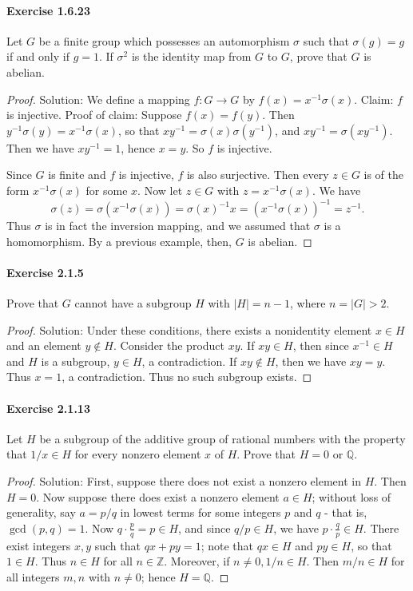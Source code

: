 \documentclass{article}
\theoremstyle{definition}
\begin{document}
\paragraph{Exercise 1.6.23} Let $G$ be a finite group which possesses an automorphism $\sigma$ such that $\sigma(g)=g$ if and only if $g=1$. If $\sigma^{2}$ is the identity map from $G$ to $G$, prove that $G$ is abelian.
\begin{proof}
    Solution: We define a mapping $f: G \rightarrow G$ by $f(x)=x^{-1} \sigma(x)$.
Claim: $f$ is injective.
Proof of claim: Suppose $f(x)=f(y)$. Then $y^{-1} \sigma(y)=x^{-1} \sigma(x)$, so that $x y^{-1}=\sigma(x) \sigma\left(y^{-1}\right)$, and $x y^{-1}=\sigma\left(x y^{-1}\right)$. Then we have $x y^{-1}=1$, hence $x=y$. So $f$ is injective.

Since $G$ is finite and $f$ is injective, $f$ is also surjective. Then every $z \in G$ is of the form $x^{-1} \sigma(x)$ for some $x$. Now let $z \in G$ with $z=x^{-1} \sigma(x)$. We have
$$
\sigma(z)=\sigma\left(x^{-1} \sigma(x)\right)=\sigma(x)^{-1} x=\left(x^{-1} \sigma(x)\right)^{-1}=z^{-1} .
$$
Thus $\sigma$ is in fact the inversion mapping, and we assumed that $\sigma$ is a homomorphism. By a previous example, then, $G$ is abelian.
\end{proof}



\paragraph{Exercise 2.1.5} Prove that $G$ cannot have a subgroup $H$ with $|H|=n-1$, where $n=|G|>2$.
\begin{proof}
    Solution: Under these conditions, there exists a nonidentity element $x \in H$ and an element $y \notin H$. Consider the product $x y$. If $x y \in H$, then since $x^{-1} \in H$ and $H$ is a subgroup, $y \in H$, a contradiction. If $x y \notin H$, then we have $x y=y$. Thus $x=1$, a contradiction. Thus no such subgroup exists.
\end{proof}



\paragraph{Exercise 2.1.13} Let $H$ be a subgroup of the additive group of rational numbers with the property that $1 / x \in H$ for every nonzero element $x$ of $H$. Prove that $H=0$ or $\mathbb{Q}$.
\begin{proof}
    Solution: First, suppose there does not exist a nonzero element in $H$. Then $H=0$.
Now suppose there does exist a nonzero element $a \in H$; without loss of generality, say $a=p / q$ in lowest terms for some integers $p$ and $q$ - that is, $\operatorname{gcd}(p, q)=1$. Now $q \cdot \frac{p}{q}=p \in H$, and since $q / p \in H$, we have $p \cdot \frac{q}{p} \in H$. There exist integers $x, y$ such that $q x+p y=1$; note that $q x \in H$ and $p y \in H$, so that $1 \in H$. Thus $n \in H$ for all $n \in \mathbb{Z}$. Moreover, if $n \neq 0,1 / n \in H$. Then $m / n \in H$ for all integers $m, n$ with $n \neq 0$; hence $H=\mathbb{Q}$.
\end{proof}
\end{document}
